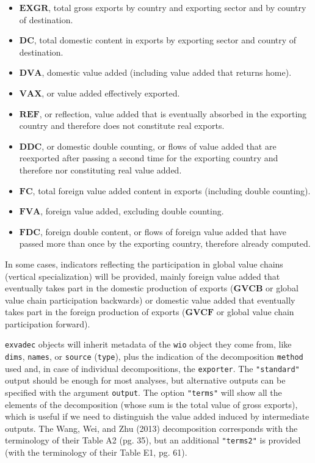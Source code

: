 \begin{itemize}
\tightlist
\item
  \(\mathbf{EXGR}\), total gross exports by country and exporting sector
  and by country of destination.
\item
  \(\mathbf{DC}\), total domestic content in exports by exporting sector
  and country of destination.
\item
  \(\mathbf{DVA}\), domestic value added (including value added that
  returns home).
\item
  \(\mathbf{VAX}\), or value added effectively exported.
\item
  \(\mathbf{REF}\), or reflection, value added that is eventually absorbed
  in the exporting country and therefore does not constitute real exports.
\item
  \(\mathbf{DDC}\), or domestic double counting, or flows of value added
  that are reexported after passing a second time for the exporting country
  and therefore nor constituting real value added.
\item
  \(\mathbf{FC}\), total foreign value added content in exports
  (including double counting).
\item
  \(\mathbf{FVA}\), foreign value added, excluding double counting.
\item
  \(\mathbf{FDC}\), foreign double content, or flows of foreign value added
  that have passed more than once by the exporting country, therefore already
  computed.
\end{itemize}

In some cases, indicators reflecting the participation in global value chains
(vertical specialization) will be provided, mainly foreign value added that
eventually takes part in the domestic production of exports (\(\mathbf{GVCB}\) or
global value chain participation backwards) or domestic value added that
eventually takes part in the foreign production of exports (\(\mathbf{GVCF}\) or
global value chain participation forward).

\texttt{exvadec} objects will inherit metadata of the \texttt{wio} object they come from, like
\texttt{dims}, \texttt{names}, or \texttt{source} (\texttt{type}), plus the indication of the decomposition
\texttt{method} used and, in case of individual decompositions, the \texttt{exporter}. The
\texttt{"standard"} output should be enough for most analyses, but alternative outputs
can be specified with the argument \texttt{output}. The option \texttt{"terms"} will show all
the elements of the decomposition (whose sum is the total value of gross
exports), which is useful if we need to distinguish the value added induced by
intermediate outputs. The Wang, Wei, and Zhu (2013) decomposition corresponds with
the terminology of their Table A2 (pg. 35), but an additional \texttt{"terms2"} is
provided (with the terminology of their Table E1, pg. 61).

